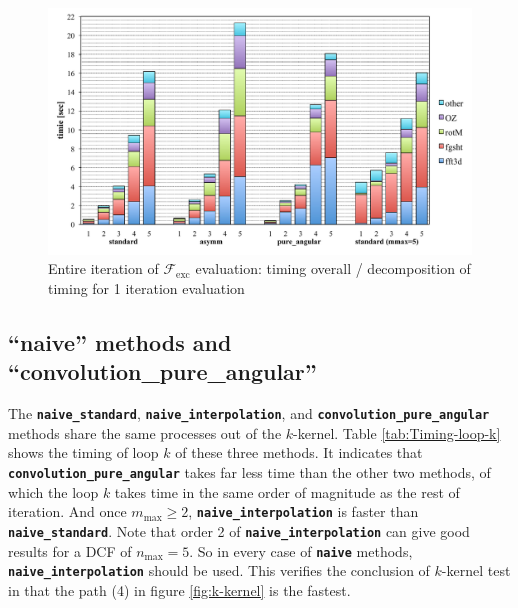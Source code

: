 \begin{figure}[H]
\begin{centering}
\includegraphics[width=0.9\columnwidth]{_figure/results/branch_perf}
\par\end{centering}
\caption[Entire iteration of $\mathcal{F}_{\mathrm{exc}}$ evaluation]{Entire iteration of $\mathcal{F}_{\mathrm{exc}}$ evaluation: timing
overall / decomposition of timing for 1 iteration evaluation\label{fig:Entire-iteration}}
\end{figure}


\subsection{``naive'' methods and ``convolution\_pure\_angular''\label{subsec:Comparison-between-naive_standar}}

The \texttt{\textbf{naive\_standard}}, \texttt{\textbf{naive\_interpolation}},
and \texttt{\textbf{convolution\_pure\_angular}} methods share the
same processes out of the $k$-kernel. Table \ref{tab:Timing-loop-k}
shows the timing of loop $k$ of these three methods. It indicates
that \texttt{\textbf{convolution\_pure\_angular}} takes far less time
than the other two methods, of which the loop $k$ takes time in the
same order of magnitude as the rest of iteration. And once $m_{\max}\geq2$,
\texttt{\textbf{naive\_interpolation}} is faster than \texttt{\textbf{naive\_standard}}.
Note that order 2 of \texttt{\textbf{naive\_interpolation}} can give
good results for a \acs{DCF} of $n_{\max}=5$. So in every case of
\texttt{\textbf{naive}} methods, \texttt{\textbf{naive\_interpolation}}
should be used. This verifies the conclusion of $k$-kernel test in
that the path (4) in figure \ref{fig:k-kernel} is the fastest.

